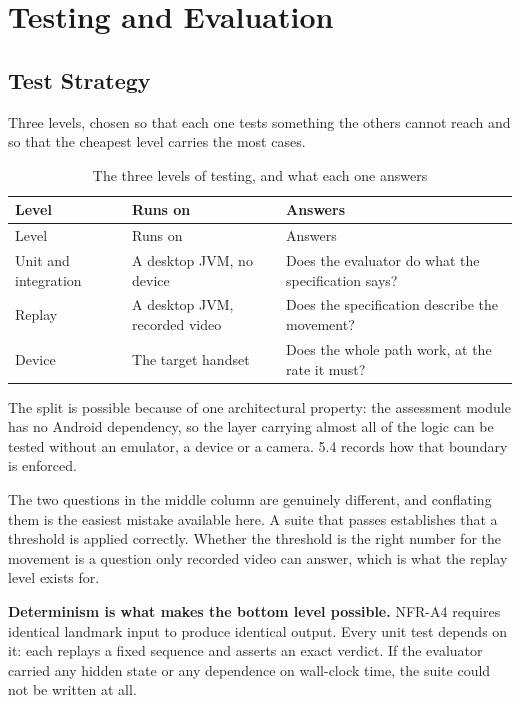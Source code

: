 \chapter{Testing and Evaluation}
\label{chap:10}

\section{Test Strategy}
\label{sec:10.1}

Three levels, chosen so that each one tests something the others cannot reach and so that the cheapest level carries the most cases.

{\small
\setlength{\LTpre}{6pt}\setlength{\LTpost}{8pt}
\begin{longtable}{>{\raggedright\arraybackslash}p{}>{\raggedright\arraybackslash}p{}>{\raggedright\arraybackslash}p{}}
\caption{The three levels of testing, and what each one answers}\\
\toprule
Level & Runs on & Answers \\
\midrule
\endfirsthead
\toprule
Level & Runs on & Answers \\
\midrule
\endhead
\bottomrule
\endfoot
\bottomrule
\endlastfoot
Unit and integration & A desktop JVM, no device & Does the evaluator do what the specification says? \\
Replay & A desktop JVM, recorded video & Does the specification describe the movement? \\
Device & The target handset & Does the whole path work, at the rate it must? \\
\end{longtable}
}

The split is possible because of one architectural property: the assessment module has no Android dependency, so the layer carrying almost all of the logic can be tested without an emulator, a device or a camera. 5.4 records how that boundary is enforced.

The two questions in the middle column are genuinely different, and conflating them is the easiest mistake available here. A suite that passes establishes that a threshold is applied correctly. Whether the threshold is the right number for the movement is a question only recorded video can answer, which is what the replay level exists for.

\textbf{Determinism is what makes the bottom level possible.} NFR-A4 requires identical landmark input to produce identical output. Every unit test depends on it: each replays a fixed sequence and asserts an exact verdict. If the evaluator carried any hidden state or any dependence on wall-clock time, the suite could not be written at all.

